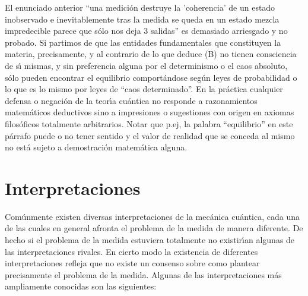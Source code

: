 \begin{enumerate}
El enunciado anterior ``una medici\'{o}n destruye la 'coherencia' de un estado inobservado e inevitablemente tras la medida se queda en un estado mezcla impredecible parece que s\'{o}lo nos deja 3 salidas'' es demasiado arriesgado y no probado. Si partimos de que las entidades fundamentales que constituyen la materia, precisamente, y al contrario de lo que deduce (B) no tienen consciencia de s\'{\i} mismas, y sin preferencia alguna por el determinismo o el caos absoluto, s\'{o}lo pueden encontrar el equilibrio comport\'{a}ndose seg\'{u}n leyes de probabilidad o lo que es lo mismo por leyes de ``caos determinado''. En la pr\'{a}ctica cualquier defensa o negaci\'{o}n de la teor\'{\i}a cu\'{a}ntica no responde a razonamientos matem\'{a}ticos deductivos sino a impresiones o sugestiones con origen en axiomas filos\'{o}ficos totalmente arbitrarios. Notar que p.ej, la palabra ``equilibrio'' en este p\'{a}rrafo puede o no tener sentido y el valor de realidad que se conceda al mismo no est\'{a} sujeto a demostraci\'{o}n matem\'{a}tica alguna.
\end{enumerate}


\section{Interpretaciones}
\label{S:interpretaciones}

Com\'{u}nmente existen diversas interpretaciones de la mec\'{a}nica cu\'{a}ntica, cada una de las cuales en general afronta el problema de la medida de manera diferente. De hecho si el problema de la medida estuviera totalmente no existir\'{\i}an algunas de las interpretaciones rivales. En cierto modo la existencia de diferentes interpretaciones refleja que no existe un consenso sobre como plantear precisamente el problema de la medida. Algunas de las interpretaciones m\'{a}s ampliamente conocidas son las siguientes\cite{Briggs1991AAMOP_TTOp1}:

